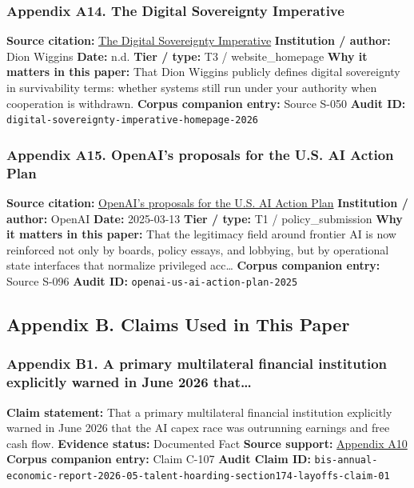 \documentclass[
  american,
  11pt,
  letterpaper,
]{article}
\begin{document}
\subsubsection{Appendix A14. The Digital Sovereignty
Imperative}\label{appendix-a14-the-digital-sovereignty-imperative}

\textbf{Source citation:}
\href{https://digitalsovereigntyimperative.com/}{The Digital Sovereignty
Imperative} \textbf{Institution / author:} Dion Wiggins \textbf{Date:}
n.d. \textbf{Tier / type:} T3 / website\_homepage \textbf{Why it matters
in this paper:} That Dion Wiggins publicly defines digital sovereignty
in survivability terms: whether systems still run under your authority
when cooperation is withdrawn. \textbf{Corpus companion entry:} Source
S-050 \textbf{Audit ID:}
\texttt{digital-sovereignty-imperative-homepage-2026}

\subsubsection{Appendix A15. OpenAI's proposals for the U.S. AI Action
Plan}\label{appendix-a15-openais-proposals-for-the-us-ai-action-plan}

\textbf{Source citation:}
\href{https://openai.com/global-affairs/openai-proposals-for-the-us-ai-action-plan/}{OpenAI's
proposals for the U.S. AI Action Plan} \textbf{Institution / author:}
OpenAI \textbf{Date:} 2025-03-13 \textbf{Tier / type:} T1 /
policy\_submission \textbf{Why it matters in this paper:} That the
legitimacy field around frontier AI is now reinforced not only by
boards, policy essays, and lobbying, but by operational state interfaces
that normalize privileged acc\ldots{} \textbf{Corpus companion entry:}
Source S-096 \textbf{Audit ID:} \texttt{openai-us-ai-action-plan-2025}

\subsection{Appendix B. Claims Used in This
Paper}\label{appendix-b.-claims-used-in-this-paper}

\subsubsection{Appendix B1. A primary multilateral financial institution
explicitly warned in June 2026
that\ldots{}}\label{appendix-b1-a-primary-multilateral-financial-institution-explicitly-warned-in-june-2026-that}

\textbf{Claim statement:} That a primary multilateral financial
institution explicitly warned in June 2026 that the AI capex race was
outrunning earnings and free cash flow. \textbf{Evidence status:}
Documented Fact \textbf{Source support:}
\hyperref[appendix-a10-annual-economic-report-2026]{Appendix A10}
\textbf{Corpus companion entry:} Claim C-107 \textbf{Audit Claim ID:}
\texttt{bis-annual-economic-report-2026-05-talent-hoarding-section174-layoffs-claim-01}
\end{document}

